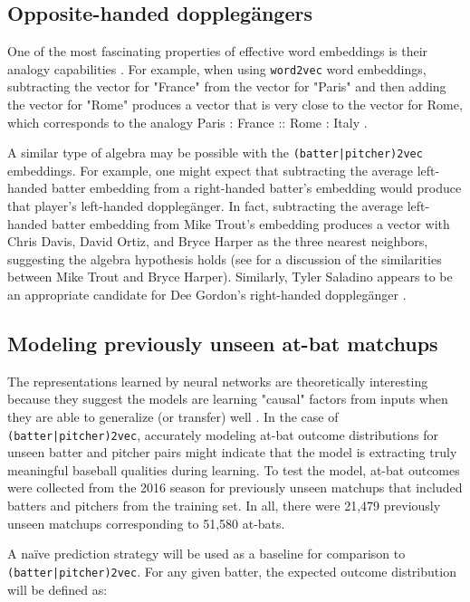 \documentclass{article}
\begin{document}
\subsection{Opposite-handed dopplegängers}

One of the most fascinating properties of effective word embeddings is their analogy capabilities \parencite{Mikolov2013a}. For example, when using \texttt{word2vec} word embeddings, subtracting the vector for "France" from the vector for "Paris" and then adding the vector for "Rome" produces a vector that is very close to the vector for Rome, which corresponds to the analogy Paris : France :: Rome : Italy \parencite{Mikolov2013a}.

A similar type of algebra may be possible with the \texttt{(batter|pitcher)2vec} embeddings. For example, one might expect that subtracting the average left-handed batter embedding from a right-handed batter's embedding would produce that player's left-handed dopplegänger. In fact, subtracting the average left-handed batter embedding from Mike Trout's embedding produces a vector with Chris Davis, David Ortiz, and Bryce Harper as the three nearest neighbors, suggesting the algebra hypothesis holds (see \parencite{Spector2016} for a discussion of the similarities between Mike Trout and Bryce Harper). Similarly, Tyler Saladino appears to be an appropriate candidate for Dee Gordon's right-handed dopplegänger \parencite{Chamberlain2017}.

\subsection{Modeling previously unseen at-bat matchups}

The representations learned by neural networks are theoretically interesting because they suggest the models are learning "causal" factors from inputs when they are able to generalize (or transfer) well \parencite{RepresentationLearning}. In the case of \texttt{(batter|pitcher)2vec}, accurately modeling at-bat outcome distributions for unseen batter and pitcher pairs might indicate that the model is extracting truly meaningful baseball qualities during learning. To test the model, at-bat outcomes were collected from the 2016 season for previously unseen matchups that included batters and pitchers from the training set. In all, there were 21,479 previously unseen matchups corresponding to 51,580 at-bats.

A naïve prediction strategy will be used as a baseline for comparison to \texttt{(batter|pitcher)2vec}. For any given batter, the expected outcome distribution will be defined as:
\end{document}
